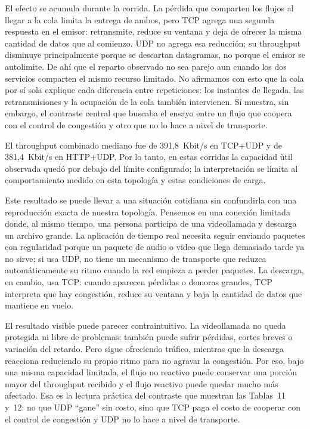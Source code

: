 \documentclass[11pt,a4paper]{article}
\begin{document}
El efecto se acumula durante la corrida. La p\'erdida que comparten los flujos al llegar a la cola limita la entrega de ambos, pero TCP agrega una segunda respuesta en el emisor: retransmite, reduce su ventana y deja de ofrecer la misma cantidad de datos que al comienzo. UDP no agrega esa reducci\'on; su throughput disminuye principalmente porque se descartan datagramas, no porque el emisor se autolimite. De ah\'i que el reparto observado no sea parejo aun cuando los dos servicios comparten el mismo recurso limitado. No afirmamos con esto que la cola por s\'i sola explique cada diferencia entre repeticiones: los instantes de llegada, las retransmisiones y la ocupaci\'on de la cola tambi\'en intervienen. S\'i muestra, sin embargo, el contraste central que buscaba el ensayo entre un flujo que coopera con el control de congesti\'on y otro que no lo hace a nivel de transporte.

El throughput combinado mediano fue de 391,8~Kbit/s en TCP+UDP y de 381,4~Kbit/s en HTTP+UDP. Por lo tanto, en estas corridas la capacidad \`util observada qued\'o por debajo del l\'imite configurado; la interpretaci\'on se limita al comportamiento medido en esta topolog\'ia y estas condiciones de carga.

Este resultado se puede llevar a una situaci\'on cotidiana sin confundirla con una reproducci\'on exacta de nuestra topolog\'ia. Pensemos en una conexi\'on limitada donde, al mismo tiempo, una persona participa de una videollamada y descarga un archivo grande. La aplicaci\'on de tiempo real necesita seguir enviando paquetes con regularidad porque un paquete de audio o video que llega demasiado tarde ya no sirve; si usa UDP, no tiene un mecanismo de transporte que reduzca autom\'aticamente su ritmo cuando la red empieza a perder paquetes. La descarga, en cambio, usa TCP: cuando aparecen p\'erdidas o demoras grandes, TCP interpreta que hay congesti\'on, reduce su ventana y baja la cantidad de datos que mantiene en vuelo.

El resultado visible puede parecer contraintuitivo. La videollamada no queda protegida ni libre de problemas: tambi\'en puede sufrir p\'erdidas, cortes breves o variaci\'on del retardo. Pero sigue ofreciendo tr\'afico, mientras que la descarga reacciona reduciendo su propio ritmo para no agravar la congesti\'on. Por eso, bajo una misma capacidad limitada, el flujo no reactivo puede conservar una porci\'on mayor del throughput recibido y el flujo reactivo puede quedar mucho m\'as afectado. Esa es la lectura pr\'actica del contraste que muestran las Tablas~11 y~12: no que UDP ``gane'' sin costo, sino que TCP paga el costo de cooperar con el control de congesti\'on y UDP no lo hace a nivel de transporte.
\end{document}
